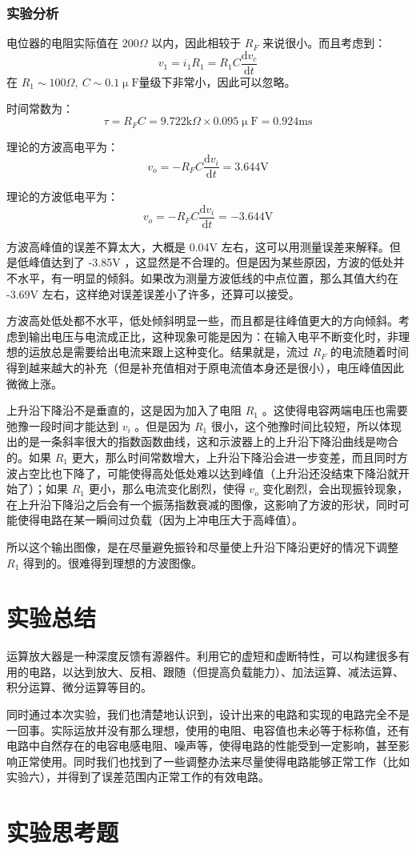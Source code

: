 \documentclass[a4paper,11pt,UTF8]{ctexart}
\newcommand\mr[1]{\mathrm{#1}}
\newcommand\dd{\mathrm{d}}
\begin{document}
\subsubsection{实验分析}
电位器的电阻实际值在 $200\Omega$ 以内，因此相较于 $R_F$ 来说很小。而且考虑到：
\[ v_1=i_1R_1=R_1C\frac{\dd v_c}{\dd t} \]
在 $R_1\sim100\Omega,~C\sim0.1\mr{\upmu F}$量级下非常小，因此可以忽略。
\par 时间常数为：
\[ \tau=R_FC=9.722\mr{k}\Omega\times0.095\mr{\upmu F}=0.924\mr{ms} \]
\par 理论的方波高电平为：
\[ v_o=-R_FC\frac{\dd v_i}{\dd t}=3.644\mr{V} \]
\par 理论的方波低电平为：
\[ v_o=-R_FC\frac{\dd v_i}{\dd t}=-3.644\mr{V} \]
\par 方波高峰值的误差不算太大，大概是 0.04V 左右，这可以用测量误差来解释。但是低峰值达到了 -3.85V ，这显然是不合理的。但是因为某些原因，方波的低处并不水平，有一明显的倾斜。如果改为测量方波低线的中点位置，那么其值大约在 -3.69V 左右，这样绝对误差误差小了许多，还算可以接受。
\par 方波高处低处都不水平，低处倾斜明显一些，而且都是往峰值更大的方向倾斜。考虑到输出电压与电流成正比，这种现象可能是因为：在输入电平不断变化时，非理想的运放总是需要给出电流来跟上这种变化。结果就是，流过 $R_F$ 的电流随着时间得到越来越大的补充（但是补充值相对于原电流值本身还是很小），电压峰值因此微微上涨。
\par 上升沿下降沿不是垂直的，这是因为加入了电阻 $R_1$ 。这使得电容两端电压也需要弛豫一段时间才能达到 $v_i$ 。但是因为 $R_1$ 很小，这个弛豫时间比较短，所以体现出的是一条斜率很大的指数函数曲线，这和示波器上的上升沿下降沿曲线是吻合的。如果 $R_1$ 更大，那么时间常数增大，上升沿下降沿会进一步变差，而且同时方波占空比也下降了，可能使得高处低处难以达到峰值（上升沿还没结束下降沿就开始了）；如果 $R_1$ 更小，那么电流变化剧烈，使得 $v_o$ 变化剧烈，会出现振铃现象，在上升沿下降沿之后会有一个振荡指数衰减的图像，这影响了方波的形状，同时可能使得电路在某一瞬间过负载（因为上冲电压大于高峰值）。
\par 所以这个输出图像，是在尽量避免振铃和尽量使上升沿下降沿更好的情况下调整 $R_1$ 得到的。很难得到理想的方波图像。

\section{实验总结}
运算放大器是一种深度反馈有源器件。利用它的虚短和虚断特性，可以构建很多有用的电路，以达到放大、反相、跟随（但提高负载能力）、加法运算、减法运算、积分运算、微分运算等目的。
\par 同时通过本次实验，我们也清楚地认识到，设计出来的电路和实现的电路完全不是一回事。实际运放并没有那么理想，使用的电阻、电容值也未必等于标称值，还有电路中自然存在的电容电感电阻、噪声等，使得电路的性能受到一定影响，甚至影响正常使用。同时我们也找到了一些调整办法来尽量使得电路能够正常工作（比如实验六），并得到了误差范围内正常工作的有效电路。

\section{实验思考题}
\end{document}
